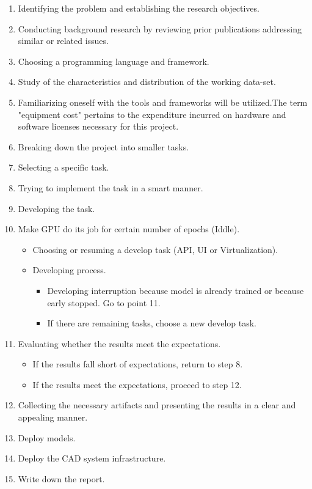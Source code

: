 \begin{enumerate}

    \item Identifying the problem and establishing the research objectives.
    \item Conducting background research by reviewing prior publications addressing similar or related issues.
    \item Choosing a programming language and framework.
    \item Study of the characteristics and distribution of the working data-set.
    \item Familiarizing oneself with the tools and frameworks will be utilized.The term "equipment cost" pertains to the expenditure incurred on hardware and software licenses necessary for this project.
    \item Breaking down the project into smaller tasks.
    \item Selecting a specific task.
    \item Trying to implement the task in a smart manner.
    \item Developing the task.
    \item Make GPU do its job for certain number of epochs (Iddle).

        \begin{itemize}
            \item Choosing or resuming a develop task (API, UI or Virtualization).
            \item Developing process.
                \begin{itemize}
                    \item Developing interruption because model is already trained or because early stopped. Go to point 11. 
                     \item If there are remaining tasks, choose a new develop task.
                \end{itemize}
        \end{itemize}

    
    \item Evaluating whether the results meet the expectations.

        \begin{itemize}
            \item If the results fall short of expectations, return to step 8.
            \item If the results meet the expectations, proceed to step 12.
        \end{itemize}

    \item Collecting the necessary artifacts and presenting the results in a clear and appealing manner.

    \item Deploy models.

    \item Deploy the CAD system infrastructure.

    \item Write down the report.
    
\end{enumerate}

